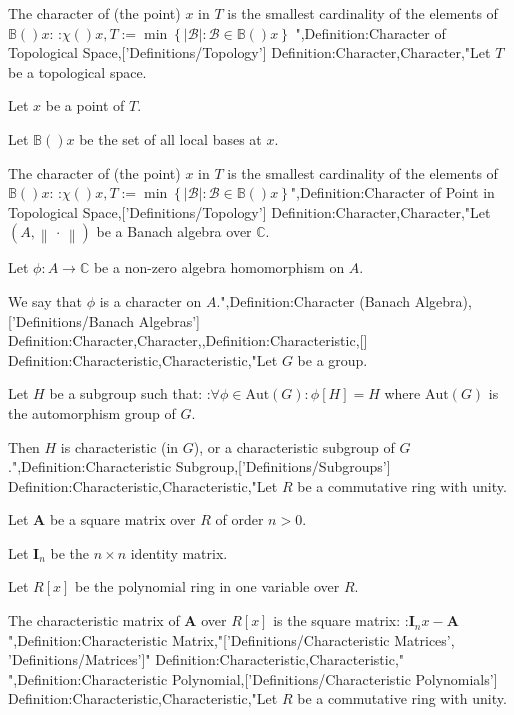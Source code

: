The character of (the point) $x$ in $T$ is the smallest cardinality of the elements of $\mathbb B \left(   \right)x$:
:$\chi \left(   \right){x, T} := \min \left\lbrace \left\lvert \mathcal B \right\rvert: \mathcal B \in \mathbb B \left(   \right)x \right\rbrace$
",Definition:Character of Topological Space,['Definitions/Topology']
Definition:Character,Character,"Let $T$ be a topological space.

Let $x$ be a point of $T$.

Let $\mathbb B \left(   \right)x$ be the set of all local bases at $x$.


The character of (the point) $x$ in $T$ is the smallest cardinality of the elements of $\mathbb B \left(   \right)x$:
:$\chi \left(   \right){x, T} := \min \left\lbrace \left\lvert \mathcal B \right\rvert: \mathcal B \in \mathbb B \left(   \right)x \right\rbrace$",Definition:Character of Point in Topological Space,['Definitions/Topology']
Definition:Character,Character,"Let $\left( A, \left\lVert \, \cdot \, \right\rVert  \right)$ be a Banach algebra over $\mathbb C$.

Let $\phi : A \to \mathbb C$ be a non-zero algebra homomorphism on $A$.


We say that $\phi$ is a character on $A$.",Definition:Character (Banach Algebra),['Definitions/Banach Algebras']
Definition:Character,Character,,Definition:Characteristic,[]
Definition:Characteristic,Characteristic,"Let $G$ be a group.

Let $H$ be a subgroup such that:
:$\forall \phi \in \mathrm {Aut} \left( G \right): \phi \left[ H \right] = H$
where $\mathrm {Aut} \left( G \right)$ is the automorphism group of $G$.


Then $H$ is  characteristic (in $G$), or a characteristic subgroup of $G$.",Definition:Characteristic Subgroup,['Definitions/Subgroups']
Definition:Characteristic,Characteristic,"Let $R$ be a commutative ring with unity.

Let $\mathbf A$ be a square matrix over $R$ of order $n > 0$.

Let $\mathbf I_n$ be the $n \times n$ identity matrix.

Let $R \left[ x \right]$ be the polynomial ring in one variable over $R$.


The characteristic matrix of $\mathbf A$ over $R \left[ x \right]$ is the square matrix:
:$\mathbf I_n x - \mathbf A$",Definition:Characteristic Matrix,"['Definitions/Characteristic Matrices', 'Definitions/Matrices']"
Definition:Characteristic,Characteristic,"
",Definition:Characteristic Polynomial,['Definitions/Characteristic Polynomials']
Definition:Characteristic,Characteristic,"Let $R$ be a commutative ring with unity.

